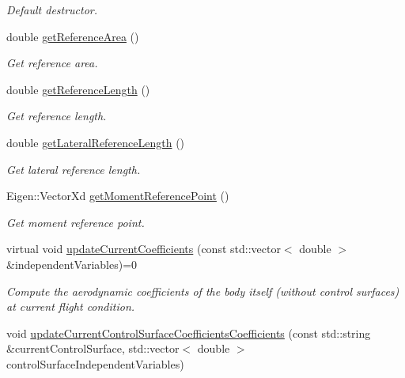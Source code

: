 \begin{DoxyCompactItemize}
\begin{DoxyCompactList}\small\item\em Default destructor. \end{DoxyCompactList}\item 
double \hyperlink{classtudat_1_1aerodynamics_1_1AerodynamicCoefficientInterface_aaf0325453208d06cfbf8aa7a854d6875}{get\+Reference\+Area} ()
\begin{DoxyCompactList}\small\item\em Get reference area. \end{DoxyCompactList}\item 
double \hyperlink{classtudat_1_1aerodynamics_1_1AerodynamicCoefficientInterface_a8bf7126281dbe7017490e77768e23670}{get\+Reference\+Length} ()
\begin{DoxyCompactList}\small\item\em Get reference length. \end{DoxyCompactList}\item 
double \hyperlink{classtudat_1_1aerodynamics_1_1AerodynamicCoefficientInterface_ac340c18b6cb008955c8dc426c31d6adb}{get\+Lateral\+Reference\+Length} ()
\begin{DoxyCompactList}\small\item\em Get lateral reference length. \end{DoxyCompactList}\item 
Eigen\+::\+Vector\+Xd \hyperlink{classtudat_1_1aerodynamics_1_1AerodynamicCoefficientInterface_ab940adb9ffb34d7910bdb11ca06143f6}{get\+Moment\+Reference\+Point} ()
\begin{DoxyCompactList}\small\item\em Get moment reference point. \end{DoxyCompactList}\item 
virtual void \hyperlink{classtudat_1_1aerodynamics_1_1AerodynamicCoefficientInterface_af68d685a47306b6525ea06bec6e91880}{update\+Current\+Coefficients} (const std\+::vector$<$ double $>$ \&independent\+Variables)=0
\begin{DoxyCompactList}\small\item\em Compute the aerodynamic coefficients of the body itself (without control surfaces) at current flight condition. \end{DoxyCompactList}\item 
void \hyperlink{classtudat_1_1aerodynamics_1_1AerodynamicCoefficientInterface_a59727b07127b2e8ef0af43b3177a0808}{update\+Current\+Control\+Surface\+Coefficients\+Coefficients} (const std\+::string \&current\+Control\+Surface, std\+::vector$<$ double $>$ control\+Surface\+Independent\+Variables)

\end{DoxyCompactItemize}
